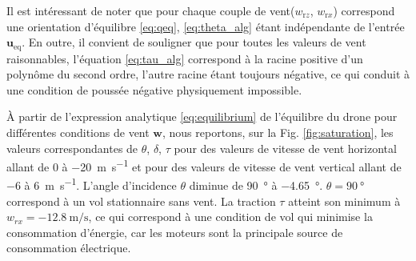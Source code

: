     Il est intéressant de noter que pour chaque couple de vent($w_{\text{r}z}$, $w_{\text{r}x}$) correspond une orientation d'équilibre \eqref{eq:qeq}, \eqref{eq:theta_alg} étant indépendante de l'entrée $\boldsymbol{u}_{\text{eq}}$. En outre, il convient de souligner que pour toutes les valeurs de vent raisonnables, l'équation \eqref{eq:tau_alg} correspond à la racine positive d'un polynôme du second ordre, l'autre racine étant toujours négative, ce qui conduit à une condition de poussée négative physiquement impossible.


    À partir de l'expression analytique \eqref{eq:equilibrium} de l'équilibre du drone pour différentes conditions de vent $\boldsymbol{w}$, nous reportons, sur la Fig. \ref{fig:saturation}, les valeurs correspondantes de $\theta$, $\delta$, $\tau$ pour des valeurs de vitesse de vent horizontal allant de 0 à \SI{-20}{\meter\per\second} et pour des valeurs de vitesse de vent vertical allant de \SI{-6}{} à \SI{6}{\meter\per\second}. L'angle d'incidence $\theta$ diminue de \SI{90}{\degree} à \SI{-4.65}{\degree}. $\theta = \SI{90}{\degree}$ correspond à un vol stationnaire sans vent. La traction $\tau$ atteint son minimum à $w_{rx} = \SI{-12.8}{\meter\per\second}$, ce qui correspond à une condition de vol qui minimise la consommation d'énergie, car les moteurs sont la principale source de consommation électrique.

